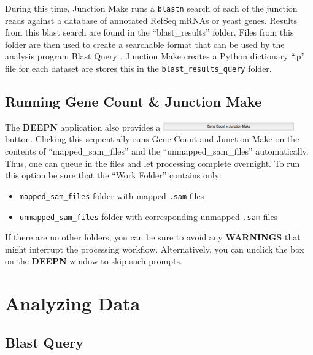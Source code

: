 \documentclass[11pt,fleqn]{book} %
\newcommand{\GeneCount}{{\color{Red} Gene Count }}
\newcommand{\JunctionMake}{{\color{Blue} Junction Make }}
\newcommand{\BlastQuery}{{\color{ForestGreen} Blast Query }}
\newcommand{\DEEPN}{\textbf{DEEPN }}
\begin{document}
During this time, \JunctionMake runs a \texttt{blastn} search of each of the junction reads against a database of annotated RefSeq mRNAs or yeast genes. Results from this blast search are found in the ``blast\_results'' folder.  Files from this folder are then used to create a searchable format that can be used by the analysis program \BlastQuery. \JunctionMake creates a Python dictionary ``.p'' file for each dataset are stores this in the \texttt{blast\_results\_query} folder.  

\chapter{Running \GeneCount \& \JunctionMake}

The \DEEPN application also provides a \includegraphics[width=160pt]{Pictures/gcjm_btn} button. Clicking this sequentially runs  \GeneCount and \JunctionMake on the contents of ``mapped\_sam\_files'' and the ``unmapped\_sam\_files'' automatically. Thus, one can queue in the files and let processing complete overnight.  To run this option be sure that the ``Work Folder'' contains only:
\begin{itemize} 
    \item \texttt{mapped\_sam\_files} folder with mapped \texttt{.sam} files 
    \item \texttt{unmapped\_sam\_files} folder with corresponding unmapped \texttt{.sam} files
\end{itemize}

If there are no other folders, you can be sure to avoid any \textbf{WARNINGS} that might interrupt the processing workflow.  Alternatively, you can unclick the box on the \DEEPN window to skip such prompts.



\part{Analyzing Data}

\chapter{\BlastQuery}
\end{document}
